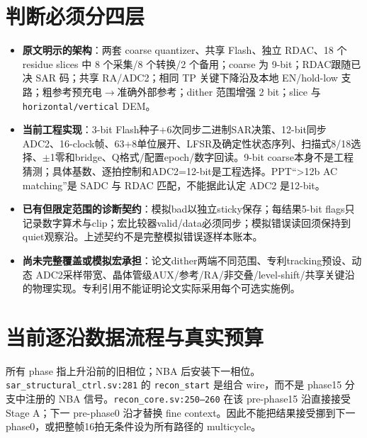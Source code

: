 \documentclass[UTF8,fontset=fandol,10pt,a4paper,openany]{ctexrep}
\newcommand{\code}[1]{\nolinkurl{#1}}
\begin{document}
\section{判断必须分四层}


\begin{itemize}
\item \textbf{原文明示的架构}：两套 coarse quantizer、共享 Flash、独立 RDAC、18 个 residue slices 中 8 个采集/8 个转换/2 个备用；coarse 为 9-bit；RDAC跟随已决 SAR 码；共享 RA/ADC2；相同 TP 关键下降沿及本地 EN/hold-low 支路；粗参考预充电\ensuremath{\rightarrow}准确外部参考；dither 范围增强 2 bit；slice 与 \code{horizontal/vertical} DEM。
\item \textbf{当前工程实现}：3-bit Flash种子+6次同步二进制SAR决策、12-bit同步 ADC2、16-clock帧、63+8单位展开、LFSR及确定性状态序列、扫描式8/18选择、\ensuremath{\pm}1零和bridge、Q格式/配置epoch/数字回读。9-bit coarse本身不是工程猜测；具体基数、逐拍控制和ADC2=12-bit是工程选择。PPT“>12b AC matching”是 SADC 与 RDAC 匹配，不能据此认定 ADC2 是12-bit。
\item \textbf{已有但限定范围的诊断契约}：模拟bad以独立sticky保存；每结果5-bit flags只记录数字算术与clip；宏比较器valid/data必须同步；模拟错误读回须保持到quiet观察沿。上述契约不是完整模拟错误逐样本账本。
\item \textbf{尚未完整覆盖或模拟宏承担}：论文dither两端不同范围、专利tracking预设、动态 ADC2采样带宽、晶体管级AUX/参考/RA/非交叠/level-shift/共享关键沿的物理实现。专利引用不能证明论文实际采用每个可选实施例。
\end{itemize}


\section{当前逐沿数据流程与真实预算}


所有 phase 指上升沿前的旧相位；NBA 后安装下一相位。\code{sar_structural_ctrl.sv:281} 的 \code{recon_start} 是组合 wire，而不是 phase15 分支中注册的 NBA 信号。\code{recon_core.sv:250–260} 在该 pre-phase15 沿直接接受 Stage A；下一 pre-phase0 沿才替换 fine context。因此不能把结果接受挪到下一phase0，或把整帧16拍无条件设为所有路径的 multicycle。
\end{document}
